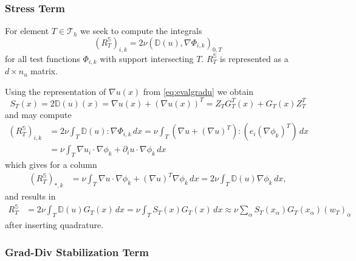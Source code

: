 \documentclass[a4paper,
		     12pt,
		     DIV10,
		     DIVcalc,
		     headings=normal,
		     oneside,
		     bibliography=totoc,
		     headsepline=false,
		     headinclude]{scrartcl}
\theoremstyle{definition}
\begin{document}
\subsubsection*{Stress Term}

For element $T\in\mathcal{T}_h$ we seek to compute the integrals 
$$(R^\mathbb{S}_T)_{i,k} = 2\nu(\mathbb{D}(u),\nabla\Phi_{i,k})_{0,T}$$ for all test functions $\Phi_{i,k}$
with support intersecting $T$. $R^\mathbb{S}_T$ is represented as a $d\times n_u$ matrix.

Using the representation of $\nabla u(x)$ from \eqref{eq:evalgradu} we obtain
\begin{equation}
S_T(x) = 2\mathbb{D}(u)(x) = \nabla u(x) + (\nabla u(x))^T
= Z_T G^T_T(x) + G_T(x) Z^T_T 
\end{equation}
and may compute
\begin{equation*}
\begin{split}
\left(R^\mathbb{S}_T \right)_{i,k} &= 2\nu \int_T \mathbb{D}(u) : \nabla\Phi_{i,k} \, dx
= \nu \int_T (\nabla u + (\nabla u)^T) :( e_i (\nabla\phi_k)^T) \, dx \\
&= \nu \int_T \nabla u_i \cdot \nabla\phi_k + \partial_i u \cdot \nabla\phi_k \, dx
\end{split}
\end{equation*}
which gives for a column
\begin{equation*}
\begin{split}
\left(R^\mathbb{S}_T \right)_{\ast,k} 
&= \nu \int_T \nabla u \cdot \nabla\phi_k + (\nabla u)^T \nabla\phi_k \, dx
= 2\nu \int_T \mathbb{D}(u) \nabla\phi_k \, dx,
\end{split}
\end{equation*}
and results in
\begin{equation}
\begin{split}
R^\mathbb{S}_T &= 2\nu \int_T \mathbb{D}(u) G_T(x) \, dx = \nu \int_T S_T(x) G_T(x) \, dx 
\approx \nu \sum_\alpha S_T(x_\alpha) G_T(x_\alpha) (w_T)_\alpha
\end{split}
\end{equation}
after inserting quadrature.

\subsubsection*{Grad-Div Stabilization Term}
\end{document}
